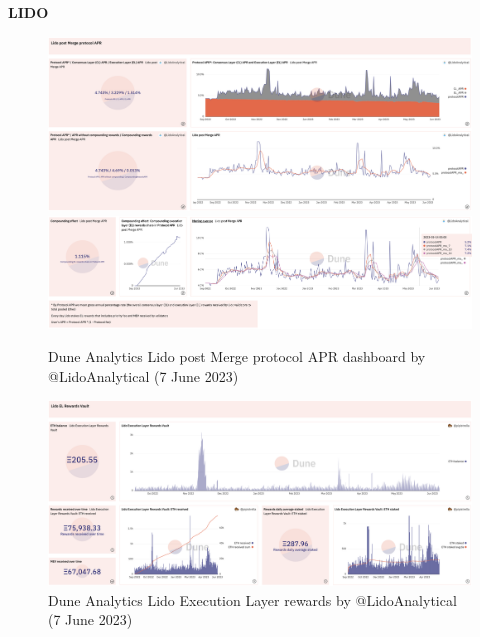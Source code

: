 \documentclass[UTF8]{article}
\begin{document}
\clearpage
\textbf{LIDO}
\begin{figure}[htbp]
\begin{center}
\includegraphics[width=\linewidth]{images/dunelido1}\\
\includegraphics[width=\linewidth]{images/dunelido2}
\caption{Dune Analytics Lido post Merge protocol APR dashboard by @LidoAnalytical  (7 June 2023)}
\label{fig:dunelido1}
\end{center}
\end{figure}

\begin{figure}[htbp]
\begin{center}
\includegraphics[width=\linewidth]{images/dunelido3}
\caption{Dune Analytics Lido Execution Layer rewards by @LidoAnalytical  (7 June 2023)}
\label{fig:dunelido3}
\end{center}
\end{figure}
\end{document}
